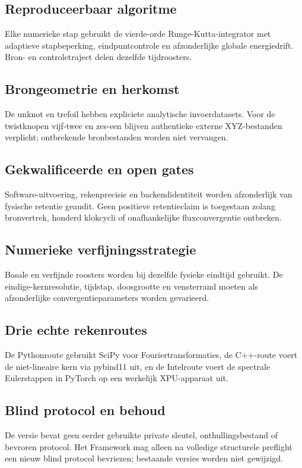 \documentclass[10pt,a4paper]{article}
\begin{document}
\subsection{Reproduceerbaar algoritme}
Elke numerieke stap gebruikt de vierde-orde Runge-Kutta-integrator met adaptieve stapbeperking, eindpuntcontrole en afzonderlijke globale energiedrift. Bron- en controletraject delen dezelfde tijdroosters.
\subsection{Brongeometrie en herkomst}
De unknot en trefoil hebben expliciete analytische invoerdatasets. Voor de twistknopen vijf-twee en zes-een blijven authentieke externe XYZ-bestanden verplicht; ontbrekende bronbestanden worden niet vervangen.
\subsection{Gekwalificeerde en open gates}
Software-uitvoering, rekenprecisie en backendidentiteit worden afzonderlijk van fysische retentie geaudit. Geen positieve retentieclaim is toegestaan zolang bronvertrek, honderd klokcycli of onafhankelijke fluxconvergentie ontbreken.
\subsection{Numerieke verfijningsstrategie}
Basale en verfijnde roosters worden bij dezelfde fysieke eindtijd gebruikt. De eindige-kernresolutie, tijdstap, doosgrootte en vensterrand moeten als afzonderlijke convergentieparameters worden gevarieerd.
\subsection{Drie echte rekenroutes}
De Pythonroute gebruikt SciPy voor Fouriertransformaties, de C++-route voert de niet-lineaire kern via pybind11 uit, en de Intelroute voert de spectrale Eulerstappen in PyTorch op een werkelijk XPU-apparaat uit.
\subsection{Blind protocol en behoud}
De versie bevat geen eerder gebruikte private sleutel, onthullingsbestand of bevroren protocol. Het Framework mag alleen na volledige structurele preflight een nieuw blind protocol bevriezen; bestaande versies worden niet gewijzigd.
\end{document}
